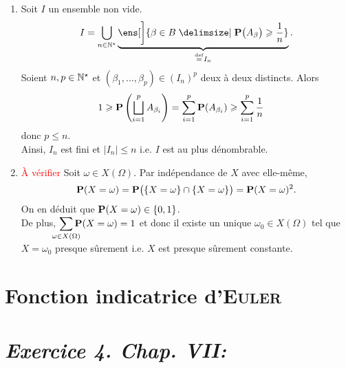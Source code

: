 \begin{solution}
\begin{enumerate}
    \item Soit $I$ un ensemble non vide. 
    $$I = \bigcup_{n \in \Ne} \underbrace{\ens[\bigg]{ \beta \in B \tq \P\big(A_\beta\big) \geqslant \frac{1}{n} }}_{\defeq I_n}.$$
    Soient $n, p \in \Ne$ et $(\beta_1, \dots, \beta_p) \in (I_n)^p$ deux à deux distincts. Alors
    \begin{align*}
        1 \geqslant \P \left( \bigsqcup_{i=1}^p A_{\beta_i} \right) &= \sum_{i=1}^p \P(A_{\beta_i}) \geqslant \sum_{i=1}^p \frac{1}{n}
    \end{align*}
    donc $p \leqslant n$. \\
    Ainsi, $I_n$ est fini et $|I_n| \leqslant n$ i.e. $I$ est au plus dénombrable. 
    \item \textcolor{red}{À vérifier} Soit $\omega \in X(\Omega)$. Par indépendance de $X$ avec elle-même,
    $$\P(X = \omega) = \P \big( \{X=\omega\} \cap \{X=\omega\} \big) = \P(X=\omega)^2.$$
    On en déduit que $\P(X=\omega) \in \{ 0, 1 \}$. \\
    De plus, $\smashoperator{\sum\limits_{\omega \in X(\Omega)}} \P(X=\omega) = 1$ et donc il existe un unique $\omega_0 \in X(\Omega)$ tel que $X=\omega_0$ presque sûrement i.e. $X$ est presque sûrement constante. 
\end{enumerate}
\end{solution}

\section{Fonction indicatrice d'\textsc{Euler}}


\section{\emph{Exercice 4. Chap. VII:}}
